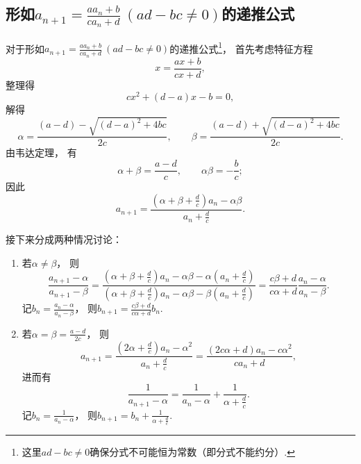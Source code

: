 \subsection{\texorpdfstring{形如\(a_{n+1} = \frac{a a_n + b}{c a_n + d}\ (ad-bc\neq0)\)的递推公式}{第二类递推公式}}
对于形如\(a_{n+1} = \frac{a a_n + b}{c a_n + d}\ (ad-bc\neq0)\)的递推公式\footnote{
	这里\(ad-bc\neq0\)确保分式不可能恒为常数（即分式不能约分）.
}，
首先考虑特征方程\begin{equation*}
	x = \frac{ax+b}{cx+d},
\end{equation*}
整理得\begin{equation*}
	cx^2+(d-a)x-b=0,
\end{equation*}
解得\begin{equation*}
	\alpha=\frac{(a-d)-\sqrt{(d-a)^2+4bc}}{2c}, \qquad
	\beta=\frac{(a-d)+\sqrt{(d-a)^2+4bc}}{2c}.
\end{equation*}
由韦达定理，
有\begin{equation*}
	\alpha+\beta=\frac{a-d}{c}, \qquad
	\alpha\beta=-\frac{b}{c};
\end{equation*}
因此\begin{equation*}
	a_{n+1} = \frac{\left(\alpha+\beta+\frac{d}{c}\right) a_n - \alpha\beta}{a_n + \frac{d}{c}}.
\end{equation*}

接下来分成两种情况讨论：\begin{enumerate}
	\item 若\(\alpha\neq\beta\)，
	则\begin{equation*}
		\frac{a_{n+1}-\alpha}{a_{n+1}-\beta}
		= \frac
			{
				\left(\alpha+\beta+\frac{d}{c}\right) a_n - \alpha\beta - \alpha \left(a_n + \frac{d}{c}\right)
			}
			{
				\left(\alpha+\beta+\frac{d}{c}\right) a_n - \alpha\beta - \beta \left(a_n + \frac{d}{c}\right)
			}
		= \frac{c\beta+d}{c\alpha+d} \frac{a_n-\alpha}{a_n-\beta}.
	\end{equation*}
	记\(b_n = \frac{a_n-\alpha}{a_n-\beta}\)，
	则\(b_{n+1} = \frac{c\beta+d}{c\alpha+d} b_n\).

	\item 若\(\alpha=\beta=\frac{a-d}{2c}\)，
	则\begin{equation*}
		a_{n+1} = \frac{\left(2\alpha+\frac{d}{c}\right) a_n - \alpha^2}{a_n + \frac{d}{c}}
		= \frac{(2c\alpha+d)a_n-c\alpha^2}{c a_n+d},
	\end{equation*}
	进而有\begin{equation*}
		\frac{1}{a_{n+1}-\alpha}=\frac{1}{a_n-\alpha}+\frac{1}{\alpha+\frac{d}{c}}.
	\end{equation*}
	记\(b_n = \frac{1}{a_n-\alpha}\)，
	则\(b_{n+1} = b_n + \frac{1}{\alpha+\frac{d}{c}}\).
\end{enumerate}
